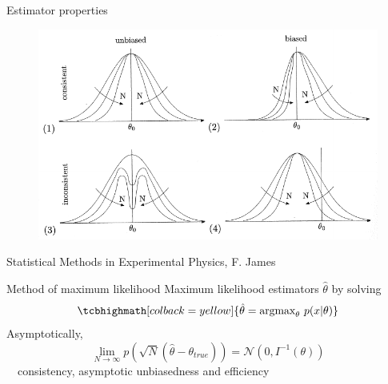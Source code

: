 \documentclass[
aspectratio=169,
14pt,
professionalfonts
]{beamer}
\newcommand{\arrow}{~\ding{220}~}
\begin{document}
\begin{frame}{Estimator properties}
    \vspace{-0.5cm}
    \begin{figure}
    \centering
    \includegraphics[width=0.75\linewidth]{../plots/estimator.pdf}
\end{figure}
\begin{flushright}
    \small
    Statistical Methods in Experimental Physics, F. James
\end{flushright}
\end{frame}

\begin{frame}{Method of maximum likelihood}
    \vspace{-0.2cm}
    Maximum likelihood estimators $ \hat \theta$ by solving
    $$
    \tcbhighmath[colback=yellow]{
        \hat \theta = \text{argmax}_\theta ~ p(x|\theta)
    }
    $$
    Asymptotically,
    $$
    \lim_{N \to \infty} p\left(\sqrt{N}(\hat \theta - \theta_{true})\right) = \mathcal{N}\left(0, I^{-1}(\theta)\right)
    $$
    \arrow consistency, asymptotic unbiasedness and efficiency
\end{frame}

\end{document}

